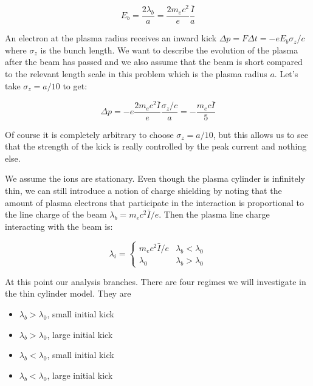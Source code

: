 \documentclass[aps,prl,preprint,groupedaddress]{revtex4-1}
\begin{document}
\begin{equation}\label{eq:E_beam}
E_b = \frac{2 \lambda_b}{a} = \frac{2m_e c^2}{e} \frac{\bar{I}}{a}
\end{equation}

An electron at the plasma radius receives an inward kick $\Delta p = F \Delta t = -e E_b \sigma_z/c$ where $\sigma_z$ is the bunch length. We want to describe the evolution of the plasma after the beam has passed and we also assume that the beam is short compared to the relevant length scale in this problem which is the plasma radius $a$. Let's take $\sigma_z = a/10$ to get:

\begin{equation}\label{eq:norm_kick}
\Delta p = -e \frac{2m_e c^2 \bar{I}}{e}\frac{\sigma_z/c}{a} = -\frac{m_e c \bar{I}}{5}
\end{equation}  

Of course it is completely arbitrary to choose $\sigma_z = a/10$, but this allows us to see that the strength of the kick is really controlled by the peak current and nothing else. 


We assume the ions are stationary. Even though the plasma cylinder is infinitely thin, we can still introduce a notion of charge shielding by noting that the amount of plasma electrons that participate in the interaction is proportional to the line charge of the beam $\lambda_b = m_e c^2 \bar{I}/e$. Then the plasma line charge interacting with the beam is:

\begin{equation}\label{eq:part_charge}
\lambda_i = \left\{ \begin{array}{lr}
m_e c^2 \bar{I}/e & \lambda_b < \lambda_0 \\
\lambda_0 & \lambda_b > \lambda_0
\end{array} \right.
\end{equation}

At this point our analysis branches. There are four regimes we will investigate in the thin cylinder model. They are

\begin{itemize}
\item $\lambda_b > \lambda_0$, small initial kick
\item $\lambda_b > \lambda_0$, large initial kick
\item $\lambda_b < \lambda_0$, small initial kick
\item $\lambda_b < \lambda_0$, large initial kick
\end{itemize}
\end{document}
